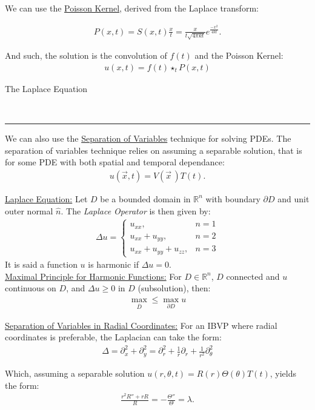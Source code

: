 \documentclass{article}
\newcommand{\header}[1]{\begin{large}\noindent #1\end{large}\\\rule{\textwidth}{0.5pt}}
\newcommand{\sheader}[1]{\underline{#1:}}
\newcommand{\gap}{\medskip\\}
\begin{document}
We can use the \underline{Poisson Kernel}, derived from the 
Laplace transform:

\begin{align*}
    P(x, t) = S(x, t) \frac{x}{t} = \frac{x}{t\sqrt{4\pi kt}}e^{\frac{-x^2}{4kt}}.
\end{align*}

And such, the solution is the convolution of $f(t)$ and the Poisson Kernel:
\begin{align*}
    u(x, t) = f(t) \star_t P(x, t)
\end{align*}

\header{The Laplace Equation}

We can also use the \underline{Separation of Variables} technique for 
solving PDEs. The separation of variables technique relies on assuming 
a separable solution, that is for some PDE with both spatial and 
temporal dependance:
\begin{align*}
    u(\vec{x}, t) = V(\vec{x}\,)T(t).
\end{align*}

\sheader{Laplace Equation} Let $D$ be a bounded domain in $\mathbb{R}^n$
with boundary $\partial D$ and unit outer normal $\hat{n}$. The 
\textit{Laplace Operator} is then given by:
\begin{align*}
    \Delta u = \begin{cases}
        u_{xx}, & n=1\\
        u_{xx} + u_{yy}, & n = 2\\
        u_{xx} + u_{yy} + u_{zz}, & n = 3
    \end{cases}
\end{align*}
It is said a function $u$ is harmonic if $\Delta u = 0$.
\gap
\sheader{Maximal Principle for Harmonic Functions} For 
$D \in \mathbb{R}^n$, $D$ connected and $u$ continuous on $D$,
and $\Delta u \geq 0$ in $D$ (subsolution), then:
\begin{align*}
    \max_{\overline{D}} \leq \max_{\partial D}u
\end{align*}

\sheader{Separation of Variables in Radial Coordinates} For an IBVP where 
radial coordinates is preferable, the Laplacian can take the form:
\begin{align*}
    \Delta = \partial_x^2 + \partial_y^2 = \partial_r^2 + \frac{1}{r} \partial_r + \frac{1}{r^2} \partial_\theta^2
\end{align*}

Which, assuming a separable solution $u(r, \theta, t) = R(r)\Theta(\theta)T(t)$, yields the form:
\begin{align*}
    \frac{r^2 R'' + rR}{R} = -\frac{\Theta''}{\Theta} = \lambda.
\end{align*}
\end{document}
